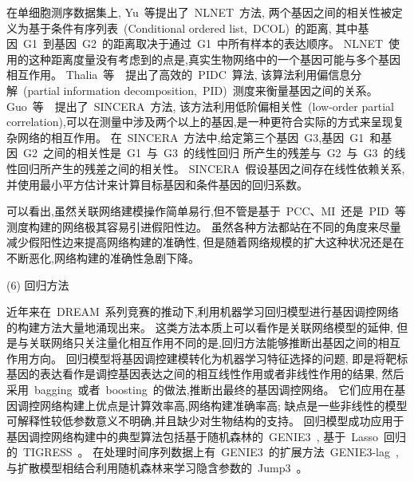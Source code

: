 在单细胞测序数据集上,
Yu~等提出了~NLNET~方法\cite{yu2013hierarchical}, 
两个基因之间的相关性被定义为基于条件有序列表~(Conditional ordered list,~DCOL)~的距离,
其中基因~G1~到基因~G2~的距离取决于通过~G1~中所有样本的表达顺序。
NLNET~使用的这种距离度量没有考虑到的点是,真实生物网络中的一个基因可能与多个基因相互作用。
Thalia~等~\cite{chan2017gene}~提出了高效的~PIDC~算法,
该算法利用偏信息分解~(partial information decomposition,~PID)~测度来衡量基因之间的关系。
Guo~等~\cite{guo2015sincera}~提出了~SINCERA~方法, 该方法利用低阶偏相关性~(low-order partial correlation),可以在测量中涉及两个以上的基因,是一种更符合实际的方式来呈现复杂网络的相互作用。
在~SINCERA~方法中,给定第三个基因~G3,基因~G1~和基因~G2~之间的相关性是~G1~与~G3~的线性回归
所产生的残差与~G2~与~G3~的线性回归所产生的残差之间的相关性。
SINCERA~假设基因之间存在线性依赖关系,并使用最小平方估计来计算目标基因和条件基因的回归系数。

可以看出,虽然关联网络建模操作简单易行,但不管是基于~PCC、MI~还是~PID~等测度构建的网络极其容易引进假阳性边。
虽然各种方法都站在不同的角度来尽量减少假阳性边来提高网络构建的准确性,
但是随着网络规模的扩大这种状况还是在不断恶化,网络构建的准确性急剧下降。

(6) 回归方法

近年来在~DREAM~系列竞赛的推动下,利用机器学习回归模型进行基因调控网络的构建方法大量地涌现出来。
这类方法本质上可以看作是关联网络模型的延伸,
但是与关联网络只关注量化相互作用不同的是,回归方法能够推断出基因之间的相互作用方向。
回归模型将基因调控建模转化为机器学习特征选择的问题,
即是将靶标基因的表达看作是调控基因表达之间的相互线性作用或者非线性作用的结果,
然后采用~bagging~或者~boosting~的做法,推断出最终的基因调控网络。
它们应用在基因调控网络构建上优点是计算效率高,网络构建准确率高;
缺点是一些非线性的模型可解释性较低参数意义不明确,并且缺少对生物结构的支持。
回归模型成功应用于基因调控网络构建中的典型算法包括基于随机森林的~GENIE3~\cite{Huynh-Thu2010},
基于~Lasso~回归的~TIGRESS~\cite{Haury2012}。
在处理时间序列数据上有~GENIE3~的扩展方法~GENIE3-lag~\cite{huynh2012machine},
与扩散模型相结合利用随机森林来学习隐含参数的~Jump3~\cite{Huynh-Thu2014}。

